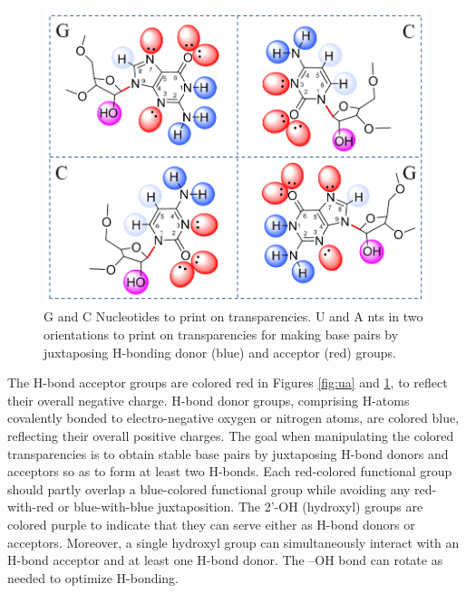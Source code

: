 \begin{figure}
  \includegraphics[width=\linewidth]{chapter-1/figs/gc}
  \caption{G and C Nucleotides to print on transparencies. U and A nts in two
    orientations to print on transparencies for making base pairs by juxtaposing
  H-bonding donor (blue) and acceptor (red) groups.}
  \label{fig:gc}
\end{figure}

The H-bond acceptor groups are colored red in Figures \ref{fig:ua} and
\ref{fig:gc}, to reflect their overall negative charge. H-bond donor groups,
comprising H-atoms covalently bonded to electro-negative oxygen or nitrogen
atoms, are colored blue, reflecting their overall positive charges. The goal
when manipulating the colored transparencies is to obtain stable base pairs by
juxtaposing H-bond donors and acceptors so as to form at least two H-bonds. Each
red-colored functional group should partly overlap a blue-colored functional
group while avoiding any red-with-red or blue-with-blue juxtaposition. The 2’-OH
(hydroxyl) groups are colored purple to indicate that they can serve either as
H-bond donors or acceptors. Moreover, a single hydroxyl group can simultaneously
interact with an H-bond acceptor and at least one H-bond donor. The –OH bond can
rotate as needed to optimize H-bonding.

